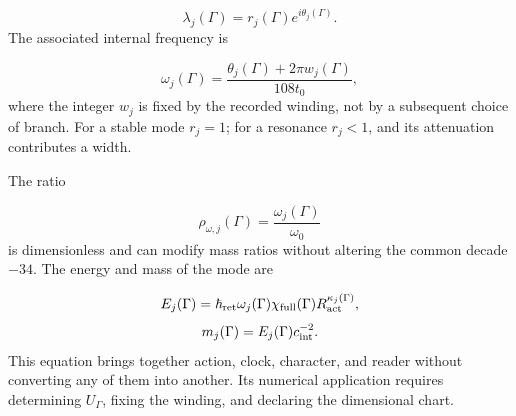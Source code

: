 \[
 \lambda_j(\Gamma)=r_j(\Gamma)e^{i\theta_j(\Gamma)}.
\]
The associated internal frequency is

\[
 \omega_j(\Gamma)
 =\frac{\theta_j(\Gamma)+2\pi w_j(\Gamma)}{108t_0},
\]
where the integer \(w_j\) is fixed by the recorded winding, not by a subsequent choice of branch. For a stable mode \(r_j=1\); for a resonance \(r_j<1\), and its attenuation contributes a width.

The ratio

\[
 \rho_{\omega,j}(\Gamma)
 =\frac{\omega_j(\Gamma)}{\omega_0}
\]
is dimensionless and can modify mass ratios without altering the common decade \(-34\). The energy and mass of the mode are

\[
 E_j(\Gamma)=\hbar_{\rm ret}\omega_j(\Gamma)
 \chi_{\rm full}(\Gamma)R_{\rm act}^{\kappa_j(\Gamma)},
\]
\[
 m_j(\Gamma)=E_j(\Gamma)c_{\rm int}^{-2}.
\]
This equation brings together action, clock, character, and reader without converting any of them into another. Its numerical application requires determining \(U_\Gamma\), fixing the winding, and declaring the dimensional chart.


